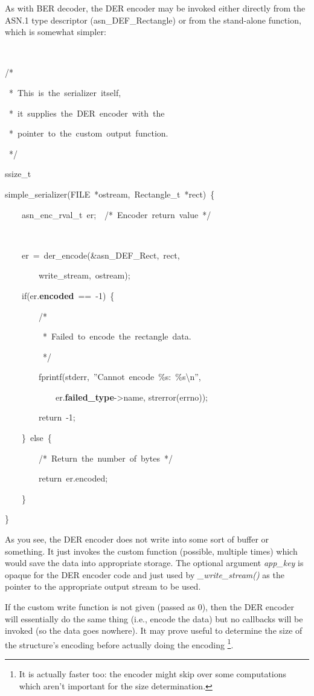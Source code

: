 \documentclass[english,oneside,12pt]{book}
\newenvironment{lyxcode}
{\par\begin{list}{}{
\setlength{\rightmargin}{\leftmargin}
\setlength{\listparindent}{0pt}%
\raggedright
\setlength{\itemsep}{0pt}
\setlength{\parsep}{0pt}
\normalfont\ttfamily}%
 \item[]}
{\end{list}}
\begin{document}
As with BER decoder, the DER encoder may be invoked either directly
from the ASN.1 type descriptor (asn\_DEF\_Rectangle) or from the stand-alone
function, which is somewhat simpler:
\begin{lyxcode}
~

/{*}

~{*}~This~is~the~serializer~itself,

~{*}~it~supplies~the~DER~encoder~with~the

~{*}~pointer~to~the~custom~output~function.

~{*}/

ssize\_t

simple\_serializer(FILE~{*}ostream,~Rectangle\_t~{*}rect)~\{

~~~~asn\_enc\_rval\_t~er;~~/{*}~Encoder~return~value~{*}/

~

~~~~er~=~der\_encode(\&asn\_DEF\_Rect,~rect,

~~~~~~~~write\_stream,~ostream);

~~~~if(er.\textbf{encoded}~==~-1)~\{

~~~~~~~~/{*}

~~~~~~~~~{*}~Failed~to~encode~the~rectangle~data.

~~~~~~~~~{*}/

~~~~~~~~fprintf(stderr,~''Cannot~encode~\%s:~\%s\textbackslash{}n'',

~~~~~~~~~~~~er.\textbf{failed\_type}->name, strerror(errno));

~~~~~~~~return~-1;

~~~~\}~else~\{

~~~~~~~~/{*}~Return~the~number~of~bytes~{*}/

~~~~~~~~return~er.encoded;

~~~~\}

\}
\end{lyxcode}
As you see, the DER encoder does not write into some sort of buffer
or something. It just invokes the custom function (possible, multiple
times) which would save the data into appropriate storage. The optional
argument \emph{app\_key} is opaque for the DER encoder code and just
used by \emph{\_write\_stream()} as the pointer to the appropriate
output stream to be used.

If the custom write function is not given (passed as 0), then the
DER encoder will essentially do the same thing (i.e., encode the data)
but no callbacks will be invoked (so the data goes nowhere). It may
prove useful to determine the size of the structure's encoding before
actually doing the encoding%
\footnote{It is actually faster too: the encoder might skip over some computations
which aren't important for the size determination.%
}.
\end{document}
